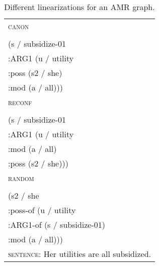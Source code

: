 \documentclass[11pt]{article}
\begin{document}
\begin{table}[!h]

	\small
	\centering
	\setlength{\tabcolsep}{3pt}
	\setlength\extrarowheight{-4pt}
	\begin{tabular}{p{7.5cm}}
		\toprule
		{\small\textsc{canon}} \\
		\\
		    (s / subsidize-01 \\
      \quad\quad :ARG1 (u / utility \\
            \quad\quad\quad\quad:poss (s2 / she) \\
            \quad\quad\quad\quad:mod (a / all))) \\
		\midrule
				{\small\textsc{reconf}} \\
		\\
		    (s / subsidize-01 \\
      \quad\quad :ARG1 (u / utility \\
            \quad\quad\quad\quad :mod (a / all) \\
            \quad\quad\quad\quad :poss (s2 / she))) \\
            
		\midrule
						{\small\textsc{random}} \\
		\\
		    (s2 / she \\
      \quad\quad :poss-of (u / utility \\
            \quad\quad\quad\quad:ARG1-of (s / subsidize-01) \\
            \quad\quad\quad\quad:mod (a / all))) \\
		\midrule
		{\small\textsc{sentence}}: Her utilities are all subsidized.\\
		\bottomrule
	\end{tabular}
\caption{Different linearizations for an AMR graph.}
	
	\label{tab:sampleamrappendix}
	\vspace{-4mm}
\end{table}
\end{document}

